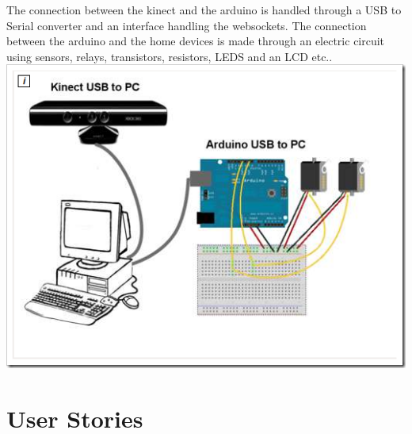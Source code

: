 The connection between the kinect and the arduino is handled through a USB to Serial converter and an interface handling the websockets.
The connection between the arduino and the home devices is made through an electric circuit using sensors, relays, transistors, resistors, LEDS and an LCD etc..
\includegraphics[scale=2]{Kinect-Arduino-Connection.png}

\section{User Stories}

